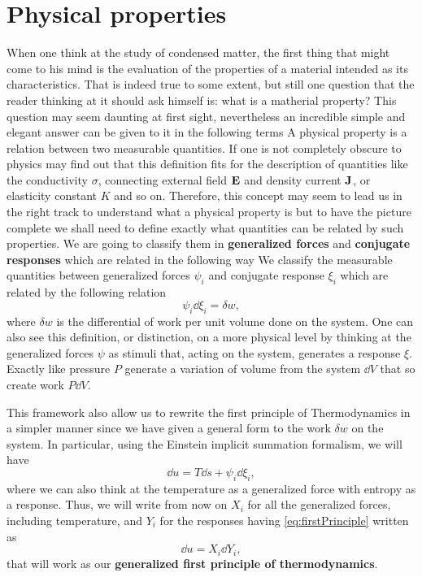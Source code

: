 \section{Physical properties}

When one think at the study of condensed matter, the first thing that might come to his mind is the evaluation of the properties of a material intended as its characteristics. That is indeed true to some extent, but still one question that the reader thinking at it should ask himself is: what is a matherial property? This question may seem daunting at first sight, nevertheless an incredible simple and elegant answer can be given to it in the following terms
{
    A physical property is a relation between two measurable quantities.
}
\noindent
If one is not completely obscure to physics may find out that this definition fits for the description of quantities like the conductivity $\sigma$, connecting external field $\vb{E}$ and density current $\vb{J}$, or elasticity constant $K$ and so on. Therefore, this concept may seem to lead us in the right track to understand what a physical property is but to have the picture complete we shall need to define exactly what quantities can be related by such properties. We are going to classify them in \textbf{generalized forces} and \textbf{conjugate responses} which are related in the following way
{
    We classify the measurable quantities between generalized forces $\psi_i$ and conjugate response $\xi_i$ which are related by the following relation
    \begin{equation}
        \psi_i\dd \xi_i = \delta w,
    \end{equation}
    where $\delta w$ is the differential of work per unit volume done on the system.
}
\noindent
One can also see this definition, or distinction, on a more physical level by thinking at the generalized forces $\psi$ as stimuli that, acting on the system, generates a response $\xi$. Exactly like pressure $P$ generate a variation of volume from the system $\dd V$ that so create work $P\dd V$.

This framework also allow us to rewrite the first principle of Thermodynamics in a simpler manner since we have given a general form to the work $\delta w$ on the system. In particular, using the Einstein implicit summation formalism, we will have
\begin{equation}
    \label{eq:firstPrinciple}
    \dd u = T\dd s + \psi_i \dd \xi_i,
\end{equation}
where we can also think at the temperature as a generalized force with entropy as a response. Thus, we will write from now on $X_i$ for all the generalized forces, including temperature, and $Y_i$ for the responses having \eqref{eq:firstPrinciple} written as
\begin{equation}
    \label{eq:genFirstPrinciple}
    \dd u = X_i\dd Y_i,
\end{equation}
that will work as our \textbf{generalized first principle of thermodynamics}.

